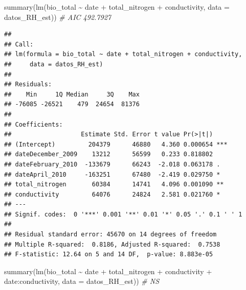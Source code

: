 \documentclass[
]{book}
\newenvironment{Shaded}{\begin{snugshade}}{\end{snugshade}}
\newcommand{\AttributeTok}[1]{\textcolor[rgb]{0.77,0.63,0.00}{#1}}
\newcommand{\CommentTok}[1]{\textcolor[rgb]{0.56,0.35,0.01}{\textit{#1}}}
\newcommand{\FunctionTok}[1]{\textcolor[rgb]{0.00,0.00,0.00}{#1}}
\newcommand{\NormalTok}[1]{#1}
\newcommand{\SpecialCharTok}[1]{\textcolor[rgb]{0.00,0.00,0.00}{#1}}
\begin{document}
\begin{Shaded}
\begin{Highlighting}[]
\FunctionTok{summary}\NormalTok{(}\FunctionTok{lm}\NormalTok{(bio\_total }\SpecialCharTok{\textasciitilde{}}\NormalTok{ date }\SpecialCharTok{+}\NormalTok{ total\_nitrogen }\SpecialCharTok{+}\NormalTok{ conductivity, }\AttributeTok{data =}\NormalTok{ datos\_RH\_est)) }\CommentTok{\# AIC 492.7927}
\end{Highlighting}
\end{Shaded}

\begin{verbatim}
## 
## Call:
## lm(formula = bio_total ~ date + total_nitrogen + conductivity, 
##     data = datos_RH_est)
## 
## Residuals:
##    Min     1Q Median     3Q    Max 
## -76085 -26521    479  24654  81376 
## 
## Coefficients:
##                   Estimate Std. Error t value Pr(>|t|)    
## (Intercept)         204379      46880   4.360 0.000654 ***
## dateDecember_2009    13212      56599   0.233 0.818802    
## dateFebruary_2010  -133679      66243  -2.018 0.063178 .  
## dateApril_2010     -163251      67480  -2.419 0.029750 *  
## total_nitrogen       60384      14741   4.096 0.001090 ** 
## conductivity         64076      24824   2.581 0.021760 *  
## ---
## Signif. codes:  0 '***' 0.001 '**' 0.01 '*' 0.05 '.' 0.1 ' ' 1
## 
## Residual standard error: 45670 on 14 degrees of freedom
## Multiple R-squared:  0.8186, Adjusted R-squared:  0.7538 
## F-statistic: 12.64 on 5 and 14 DF,  p-value: 8.883e-05
\end{verbatim}

\begin{Shaded}
\begin{Highlighting}[]
\FunctionTok{summary}\NormalTok{(}\FunctionTok{lm}\NormalTok{(bio\_total }\SpecialCharTok{\textasciitilde{}}\NormalTok{ date }\SpecialCharTok{+}\NormalTok{ total\_nitrogen }\SpecialCharTok{+}\NormalTok{ conductivity }\SpecialCharTok{+}\NormalTok{ date}\SpecialCharTok{:}\NormalTok{conductivity, }\AttributeTok{data =}\NormalTok{ datos\_RH\_est)) }\CommentTok{\# NS}
\end{Highlighting}
\end{Shaded}
\end{document}
